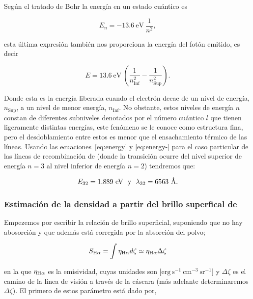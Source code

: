Según el tratado de Bohr la energía en un estado cuántico es

\begin{equation}
  \label{eq:quantum}
  E_{n} = -13.6~\text{eV}~\frac{1}{n^{2}},
\end{equation}

esta última expresión también nos proporciona la energía del fotón emitido, es decir

\begin{equation}
  \label{eq:energy-}
 E = 13.6~\text{eV}~\left(\frac{1}{n_{\text{Inf}}^{2}}-\frac{1}{n_{\text{Sup}}^{2}}\right).
\end{equation}

 Donde esta es la energía liberada cuando el electrón decae de un nivel de energía, \(n_{\text{Sup}}\), a un nivel de menor energía, \(n_{\text{Inf}}\). No obstante, estos niveles de energía \(n\) constan de diferentes subniveles denotados por el número cuántico \(l\) que tienen ligeramente distintas energías, este fenómeno se le conoce como estructura fina, pero el desdoblamiento entre estos es menor que el ensachamiento térmico de las líneas. Usando las ecuaciones~\ref{eq:energy} y \ref{eq:energy-} para el caso particular de las líneas de recombinación de \ha{} (donde la transición ocurre del nivel superior de energía \(n=3\) al nivel inferior de energía \(n=2\)) tendremos que: 

\begin{equation}
 \label{eq:values-energy-landa}
  E_{32} = 1.889~\text{eV}  ~~ \text{y} ~~
  \lambda_{32} = 6563~\text{\AA{}}{}.
 \end{equation}

\subsubsection{Estimación de la densidad a partir del brillo superfical de \ha{} }
\label{sec:brillo}

Empezemos por escribir la relación de brillo superficial, suponiendo que no hay abosorción y que además está corregida por la absorción del polvo;

\begin{equation}
  \label{eq:brillo}
  S_{\mathrm{H}\alpha{}} = \int \eta_{\mathrm{H}\alpha{}} d\zeta \simeq \eta_{\mathrm{H}\alpha{}} \Delta \zeta
\end{equation}  

\noindent en la que  \(\eta_{\mathrm{H}\alpha{}}\) es la emisividad, cuyas unidades son [\(\mathrm{erg~s^{-1}~cm^{-3}~sr^{-1}}\)] y \(\Delta \zeta\) es el camino de la línea de visión a través de la cáscara (más adelante determinaremos \(\Delta \zeta\)). El primero de estos parámetro está dado por,

